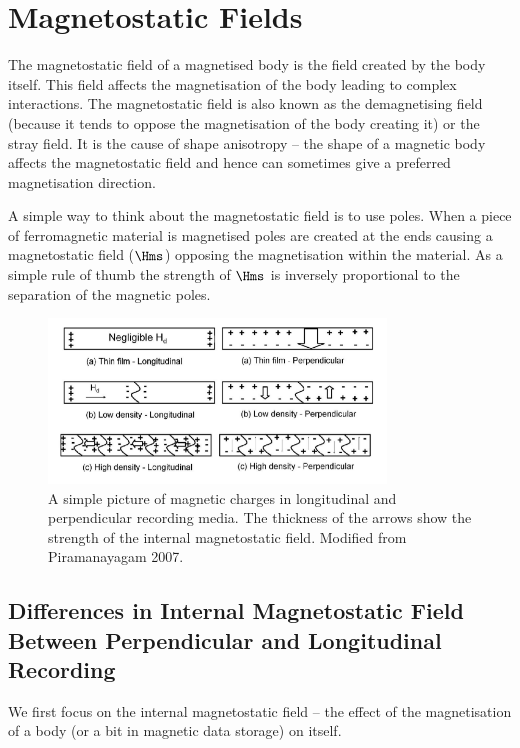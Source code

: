 \section{Magnetostatic Fields}

The magnetostatic field of a magnetised body is the field created by the body
itself. This field affects the magnetisation of the body leading to complex
interactions. The magnetostatic field is also known as the demagnetising field
(because it tends to oppose the magnetisation of the body creating it) or the
stray field. It is the cause of shape anisotropy -- the shape of a magnetic body
affects the magnetostatic field and hence can sometimes give a preferred
magnetisation direction.

A simple way to think about the magnetostatic field is to use poles. When a
piece of ferromagnetic material is magnetised poles are created at the ends
causing a magnetostatic field ($\Hms$) opposing the magnetisation within the
material. As a simple rule of thumb the strength of $\Hms$ is inversely
proportional to the separation of the magnetic poles. \cite{Piramanayagam2007a}

\begin{figure}[!ht]
  \center
  \includegraphics[width=0.8\textwidth]{./images/demagsimple}
  \caption{
    A simple picture of magnetic charges in longitudinal and perpendicular
    recording media. The thickness of the arrows show the strength of the
    internal magnetostatic field.  Modified from Piramanayagam
    2007. \cite{Piramanayagam2007a}}
  \label{fig:simple-picture-demag}
\end{figure}


\subsection{Differences in Internal Magnetostatic Field Between Perpendicular and Longitudinal Recording}
\label{sec:diff-intern-magn}
We first focus on the internal magnetostatic field -- the effect of the magnetisation of a body (or a bit in magnetic data storage) on itself.

